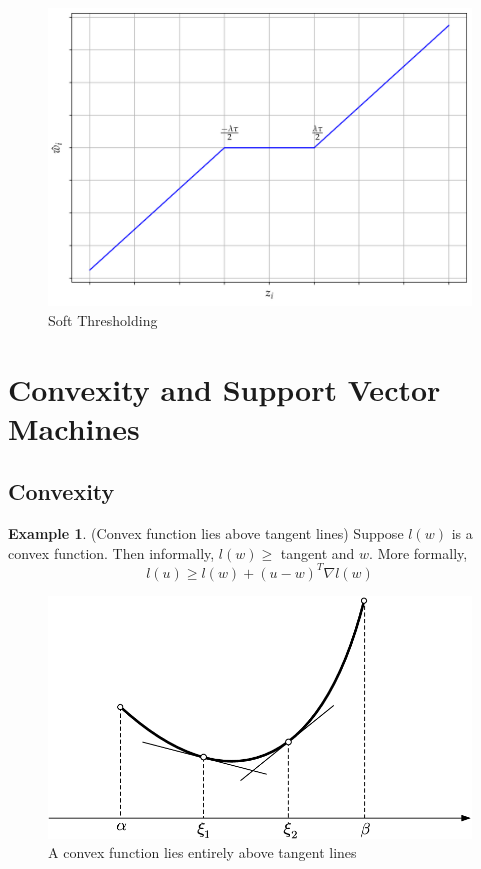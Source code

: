 \documentclass[12pt]{article}
\theoremstyle{definition}
\newtheorem{example}{Example}
\begin{document}
\begin{figure}[H]
	\begin{center}
		\includegraphics[scale=.5]{soft_thresh.png}
	\end{center}
	\caption{Soft Thresholding}
\end{figure}

\section{Convexity and Support Vector Machines}

\subsection{Convexity}
\begin{example}(Convex function lies above tangent lines)
Suppose $l(w)$ is a convex function. Then informally, $l(w) \geq $ tangent and $w$. More formally,
\begin{equation}
	l(u) \geq l(w) + (u - w)^T \nabla l(w)
\end{equation}
\end{example}
\begin{figure}[H]
	\begin{center}
		\includegraphics[scale=.4]{convex_tangent.png}
	\end{center}
	\caption{A convex function lies entirely above tangent lines}
\end{figure}
\end{document}
